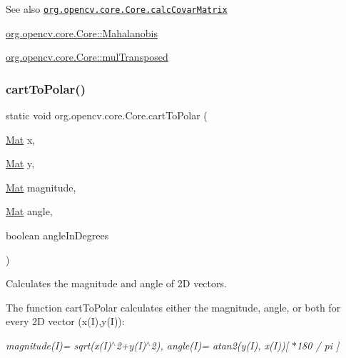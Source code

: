 \begin{DoxySeeAlso}{See also}
\href{http://docs.opencv.org/modules/core/doc/operations_on_arrays.html#calccovarmatrix}{\tt org.\+opencv.\+core.\+Core.\+calc\+Covar\+Matrix} 

\mbox{\hyperlink{classorg_1_1opencv_1_1core_1_1_core_ae6da41381cc2fc87daa1a14a2c476781}{org.\+opencv.\+core.\+Core\+::\+Mahalanobis}} 

\mbox{\hyperlink{classorg_1_1opencv_1_1core_1_1_core_aecfddbae696272a338eb12056603d4e9}{org.\+opencv.\+core.\+Core\+::mul\+Transposed}} 
\end{DoxySeeAlso}
\mbox{\label{classorg_1_1opencv_1_1core_1_1_core_a395a53b9bd769978c12c2c19a02ffeae}} 
\subsubsection{\texorpdfstring{cart\+To\+Polar()}{cartToPolar()}\hspace{0.1cm}{\footnotesize\ttfamily [1/2]}}
{\footnotesize\ttfamily static void org.\+opencv.\+core.\+Core.\+cart\+To\+Polar (\begin{DoxyParamCaption}\item[{\mbox{\hyperlink{classorg_1_1opencv_1_1core_1_1_mat}{Mat}}}]{x,  }\item[{\mbox{\hyperlink{classorg_1_1opencv_1_1core_1_1_mat}{Mat}}}]{y,  }\item[{\mbox{\hyperlink{classorg_1_1opencv_1_1core_1_1_mat}{Mat}}}]{magnitude,  }\item[{\mbox{\hyperlink{classorg_1_1opencv_1_1core_1_1_mat}{Mat}}}]{angle,  }\item[{boolean}]{angle\+In\+Degrees }\end{DoxyParamCaption})\hspace{0.3cm}{\ttfamily [static]}}

Calculates the magnitude and angle of 2D vectors.

The function {\ttfamily cart\+To\+Polar} calculates either the magnitude, angle, or both for every 2D vector (x(\+I),y(\+I))\+:

{\itshape magnitude(\+I)= sqrt(x(\+I)$^\wedge$2+y(I)$^\wedge$2), angle(\+I)= atan2(y(\+I), x(\+I))\mbox{[} $\ast$180 / pi \mbox{]} }

